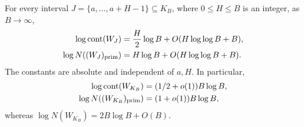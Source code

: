 \begin{theorem}
\label{cc-interval-content}
For every interval \(J=\{a,\ldots,a+H-1\}\subseteq K_B\), where
\(0\le H\le B\) is an integer, as \(B\to\infty\),
\begin{align*}
 \log\operatorname{cont}(W_J)
       &=\frac H2\log B+O(H\log\log B+B),\\
 \log N((W_J)_{\rm prim})
       &=H\log B+O(H\log\log B+B).
\end{align*}
The constants are absolute and independent of \(a,H\). In particular,
\begin{align*}
 \log\operatorname{cont}(W_{K_B})
       &=(1/2+o(1))B\log B,\\
 \log N((W_{K_B})_{\rm prim})
       &=(1+o(1))B\log B,
\end{align*}
whereas \(\log N(W_{K_B})=2B\log B+O(B)\).
\end{theorem}
